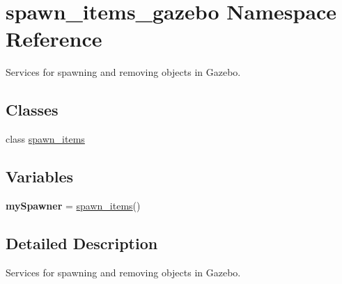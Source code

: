 \hypertarget{namespacespawn__items__gazebo}{}\section{spawn\+\_\+items\+\_\+gazebo Namespace Reference}
\label{namespacespawn__items__gazebo}


Services for spawning and removing objects in Gazebo.  


\subsection*{Classes}
\begin{DoxyCompactItemize}
\item 
class \hyperlink{classspawn__items__gazebo_1_1spawn__items}{spawn\+\_\+items}
\end{DoxyCompactItemize}
\subsection*{Variables}
\begin{DoxyCompactItemize}
\item 
\mbox{\label{namespacespawn__items__gazebo_aff540d9e597f801025b680929d264f71}} 
{\bfseries my\+Spawner} = \hyperlink{classspawn__items__gazebo_1_1spawn__items}{spawn\+\_\+items}()
\end{DoxyCompactItemize}


\subsection{Detailed Description}
Services for spawning and removing objects in Gazebo. 